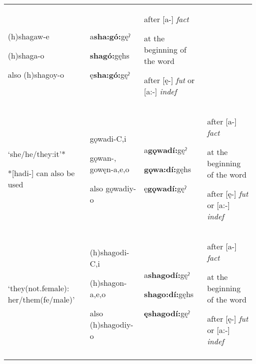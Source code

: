 \begin{table}
{\begin{tabularx}{\textwidth}{XXXX}
(h)shagaw-e

(h)shaga-o

also (h)shagoy-o & a\textbf{sha:gó:}gęˀ

\textbf{shagó:}gęhs

ę\textbf{sha:gó:}gęˀ & after [a-] \textit{fact}

at the beginning of the word 

after [ę-] \textit{fut} or [a:-] \textit{indef}\\
‘she/he/they:it’*

*[hadi-] can also be used & gǫwadi-C,i

gǫwan-, gowęn-a,e,o

also gǫwadiy-o & a\textbf{gǫwadí:}gęˀ

\textbf{gǫwa:dí:}gęhs

ę\textbf{gǫwadí:}gęˀ & after [a-] \textit{fact}

at the beginning of the word 

after [ę-] \textit{fut} or [a:-] \textit{indef}\\
‘they(not.female):
her/them(fe/male)’ & (h)shagodi-C,i

(h)shagon-a,e,o

also (h)shagodiy-o & a\textbf{shagodí:}gęˀ

\textbf{shago:dí:}gęhs

\textbf{ęshagodí:}gęˀ & after [a-] \textit{fact}

at the beginning of the word 

after [ę-] \textit{fut} or [a:-] \textit{indef}\\
\lspbottomrule
\end{tabularx}}
\end{table}


